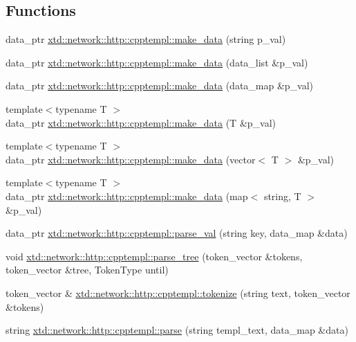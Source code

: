 \subsection*{Functions}
\begin{DoxyCompactItemize}
\item 
data\-\_\-ptr \hyperlink{namespacextd_1_1network_1_1http_1_1cpptempl_a32fe5ec0914372b09492647a168dbbcb}{xtd\-::network\-::http\-::cpptempl\-::make\-\_\-data} (string p\-\_\-val)
\item 
data\-\_\-ptr \hyperlink{namespacextd_1_1network_1_1http_1_1cpptempl_aae0780ff5e5b2afd5996fb6d27ff8ca0}{xtd\-::network\-::http\-::cpptempl\-::make\-\_\-data} (data\-\_\-list \&p\-\_\-val)
\item 
data\-\_\-ptr \hyperlink{namespacextd_1_1network_1_1http_1_1cpptempl_a4574c7173346efa3cfa420e5c657b58d}{xtd\-::network\-::http\-::cpptempl\-::make\-\_\-data} (data\-\_\-map \&p\-\_\-val)
\item 
{\footnotesize template$<$typename T $>$ }\\data\-\_\-ptr \hyperlink{namespacextd_1_1network_1_1http_1_1cpptempl_a290ac1d88dd4e0bcc65f955fb26e47c8}{xtd\-::network\-::http\-::cpptempl\-::make\-\_\-data} (T \&p\-\_\-val)
\item 
{\footnotesize template$<$typename T $>$ }\\data\-\_\-ptr \hyperlink{namespacextd_1_1network_1_1http_1_1cpptempl_af97e4f705fc7cb54a179fe88293b2bd7}{xtd\-::network\-::http\-::cpptempl\-::make\-\_\-data} (vector$<$ T $>$ \&p\-\_\-val)
\item 
{\footnotesize template$<$typename T $>$ }\\data\-\_\-ptr \hyperlink{namespacextd_1_1network_1_1http_1_1cpptempl_a9cfccbb6229825a04791ed3001f6500e}{xtd\-::network\-::http\-::cpptempl\-::make\-\_\-data} (map$<$ string, T $>$ \&p\-\_\-val)
\item 
data\-\_\-ptr \hyperlink{namespacextd_1_1network_1_1http_1_1cpptempl_af79d10d06cd5bc9ce629bb2d21fbcfd6}{xtd\-::network\-::http\-::cpptempl\-::parse\-\_\-val} (string key, data\-\_\-map \&data)
\item 
void \hyperlink{namespacextd_1_1network_1_1http_1_1cpptempl_a27515db5dde2876849fa316963a67e63}{xtd\-::network\-::http\-::cpptempl\-::parse\-\_\-tree} (token\-\_\-vector \&tokens, token\-\_\-vector \&tree, Token\-Type until)
\item 
token\-\_\-vector \& \hyperlink{namespacextd_1_1network_1_1http_1_1cpptempl_ab8c502f7e8347124c43f3dab3a583b34}{xtd\-::network\-::http\-::cpptempl\-::tokenize} (string text, token\-\_\-vector \&tokens)
\item 
string \hyperlink{namespacextd_1_1network_1_1http_1_1cpptempl_a10e259ee95bf5effff9095cdd140a058}{xtd\-::network\-::http\-::cpptempl\-::parse} (string templ\-\_\-text, data\-\_\-map \&data)
\end{DoxyCompactItemize}
